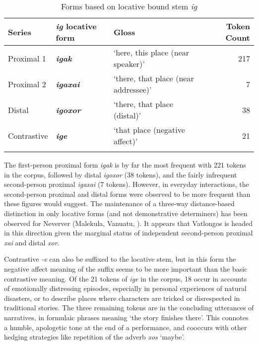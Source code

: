 \documentclass[output=paper,colorlinks,citecolor=brown]{langscibook}
\begin{document}
\begin{table}
\caption{Forms based on locative bound stem \textit{ig}}
\label{tab:ridge:5}
\begin{tabularx}{\textwidth}{llQr}
\lsptoprule
\textbf{Series} & \textbf{\textit{ig} locative form} & \textbf{Gloss} & \textbf{Token Count}\\
\midrule 
{Proximal 1} & {\textbf{\textit{igak}}}  & {‘here, this place (near speaker)’} & {217}\\
{Proximal 2} & {\textbf{\textit{igaxai}}} & {‘there, that place (near addressee)’} & {7}\\
{Distal} & {\textbf{\textit{igoxor}}} & {‘there, that place (distal)’} & {38}\\
{Contrastive} & {\textbf{\textit{ige}}} & {‘that place (negative affect)’} & {21}\\
\lspbottomrule
\end{tabularx}
\end{table}

The first-person proximal form \textit{igak} is by far the most frequent with 221 tokens in the corpus, followed by distal \textit{igoxor} (38 tokens), and the fairly infrequent second-person proximal \textit{igaxai} (7 tokens). However, in everyday interactions, the second-person proximal and distal forms were observed to be more frequent than these figures would suggest. The maintenance of a three-way distance-based distinction in only locative forms (and not demonstrative determiners) has been observed for Neverver (Malekula, Vanuatu, \citealt{Barbour2012}). It appears that Vatlongos is headed in this direction given the marginal status of independent second-person proximal \textit{xai} and distal \textit{xor}.

Contrastive \textit{-e} can also be suffixed to the locative stem, but in this form the negative affect meaning of the suffix seems to be more important than the basic contrastive meaning. Of the 21 tokens of \textit{ige} in the corpus, 18 occur in accounts of emotionally distressing episodes, especially in personal experiences of natural disasters, or to describe places where characters are tricked or disrespected in traditional stories. The three remaining tokens are in the concluding utterances of narratives, in formulaic phrases meaning ‘the story finishes there’. This connotes a humble, apologetic tone at the end of a performance, and cooccurs with other hedging strategies like repetition of the adverb \textit{xos} ‘maybe’.
\end{document}
